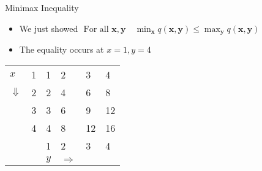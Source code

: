 \documentclass[xcolor=table]{beamer}
\begin{document}
    \begin{frame}{Minimax Inequality}
        \begin{itemize}[<+->]
            \item We just showed $\text { For all } \boldsymbol{x}, \boldsymbol{y} \quad \min _{\boldsymbol{x}} q(\boldsymbol{x}, \boldsymbol{y}) \leqslant \max _{\boldsymbol{y}} q(\boldsymbol{x}, \boldsymbol{y})$
            \item The equality occurs at $x=1, y = 4$
        \end{itemize}
        
        \begin{table}[]
            \begin{tabular}{llllll}
            \cline{2-2}
            \multicolumn{1}{l|}{$x$}          & \multicolumn{1}{l|}{1} & \cellcolor[HTML]{FFCE93}1 & \cellcolor[HTML]{FFCE93}2 & \cellcolor[HTML]{FFCE93}3 & \cellcolor[HTML]{CBCEFB}4  \\ \cline{2-2}
            \multicolumn{1}{l|}{$\Downarrow$} & \multicolumn{1}{l|}{2} & 2                         & 4                         & 6                         & \cellcolor[HTML]{CBCEFB}8  \\ \cline{2-2}
            \multicolumn{1}{l|}{}             & \multicolumn{1}{l|}{3} & 3                         & 6                         & 9                         & \cellcolor[HTML]{CBCEFB}12 \\ \cline{2-2}
            \multicolumn{1}{l|}{}             & \multicolumn{1}{l|}{4} & 4                         & 8                         & 12                        & \cellcolor[HTML]{CBCEFB}16 \\ \cline{2-6} 
            \multicolumn{1}{l|}{}             & \multicolumn{1}{l|}{}  & \multicolumn{1}{l|}{1}    & \multicolumn{1}{l|}{2}    & \multicolumn{1}{l|}{3}    & \multicolumn{1}{l|}{4}     \\ \cline{2-6} 
                                              &                        & $y$                       & $\Rightarrow$             &                           &                           
            \end{tabular}
            \end{table}
        \end{frame}

    
\end{document}
